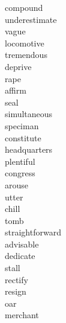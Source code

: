\documentclass[a4paper, 10pt]{ctexart}
\begin{document}
\begin{multicols*}{2}
\begin{description}
\item[compound]

\item[underestimate]

\item[vague]

\item[locomotive]

\item[tremendous]

\item[deprive]

\item[rape]

\item[affirm]

\item[seal]

\item[simultaneous]

\item[speciman]

\item[constitute]

\item[headquarters]

\item[plentiful]

\item[congress]

\item[arouse]

\item[utter]

\item[chill]

\item[tomb]

\item[straightforward]

\item[advisable]

\item[dedicate]

\item[stall]

\item[rectify]

\item[resign]

\item[oar]

\item[merchant]


\end{description}
\end{multicols*}
\end{document}

